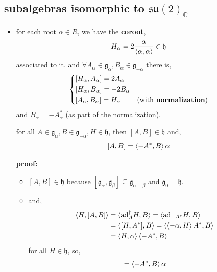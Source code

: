 \subsection{subalgebras isomorphic to \texorpdfstring{$\mathfrak{su}(2)_\mathbb{C}$}{su(2)\_C}}
\begin{itemize}
	\item for each root $\alpha \in R$, we have the \textbf{coroot},
	\begin{equation}
		H_\alpha = 2 \frac{\alpha}{\braket{\alpha, \alpha}} \in \mathfrak{h}
	\end{equation}
	associated to it, and $\forall A_\alpha \in \mathfrak{g}_\alpha, B_\alpha \in \mathfrak{g}_{- \alpha}$ there is,
	\begin{equation}
		\begin{dcases}
			[H_\alpha, A_\alpha] = 2 A_\alpha \\
			[H_\alpha, B_\alpha] = - 2 B_\alpha \\
			[A_\alpha, B_\alpha] = H_\alpha & \text{(with \textbf{normalization})}
		\end{dcases}
	\end{equation}
	and $B_\alpha = - A_\alpha^*$ (as part of the normalization).
	
	\begin{tcolorbox}[title=proof:]
		for all $A \in \mathfrak{g}_\alpha, B \in \mathfrak{g}_{- \alpha}, H \in \mathfrak{h}$, then $[A, B] \in \mathfrak{h}$ and,
		\begin{equation} \label{3.3.11}
			[A, B] = \braket{- A^*, B} \alpha
		\end{equation}
		
		\noindent\hdashrule[0.5ex]{\linewidth}{0.5pt}{1mm} %
		
		\textbf{proof:}
		
		\begin{itemize}
			\item $[A, B] \in \mathfrak{h}$ because $[\mathfrak{g}_\alpha, \mathfrak{g}_\beta] \subseteq \mathfrak{g}_{\alpha + \beta}$ and $\mathfrak{g}_0 = \mathfrak{h}$.
			
			\item and,
			\begin{align}
				\braket{H, [A, B]} &= \braket{\mathrm{ad}_A^\dag H, B} = \braket{\mathrm{ad}_{- A^*} H, B} \notag \\
				&= \braket{[H, A^*], B} = \braket{\braket{- \alpha, H} A^*, B} \notag \\
				&= \braket{H, \alpha} \braket{- A^*, B}
			\end{align}
			for all $H \in \mathfrak{h}$, so,
			\begin{equation}
				[A, B] = \braket{- A^*, B} \alpha
			\end{equation}
		\end{itemize}
		

\end{tcolorbox}
\end{itemize}
